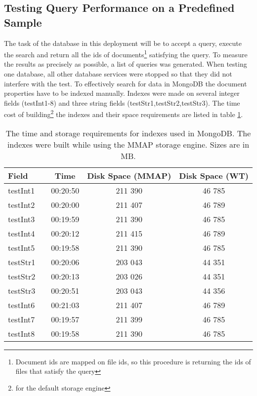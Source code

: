 \subsection{Testing Query Performance on a Predefined Sample}

The task of the database in this deployment will be to accept a query, execute the search and return all the 
ids of documents\footnote{Document ids are mapped on file ids, so this procedure is returning the ids of files
that satisfy the query} satisfying the query. To measure the results as precisely as possible, a list of
queries was generated. When testing one database, all other database services were stopped so that they did not
interfere with the test. To effectively search for data in MongoDB the document properties have to be 
indexed manually. Indexes were made on several integer fields (testInt1-8) and three string fields 
(testStr1,testStr2,testStr3). The time cost of building\footnote{for the default storage engine} the 
indexes and their space requirements are listed in table \ref{tab:indexBuildTimes}.

\begin{table}[h]
\centering
\begin{tabular}{lcccc}
\toprule
\textbf{Field}   & & \textbf{Time}     & \textbf{Disk Space (MMAP)} & \textbf{Disk Space (WT)} \\ \midrule
testInt1 & & 00:20:50 & 211 390           & 46 785          \\ \hline
testInt2 & & 00:20:00 & 211 407           & 46 789          \\ \hline
testInt3 & & 00:19:59 & 211 390           & 46 785          \\ \hline
testInt4 & & 00:20:12 & 211 415           & 46 789          \\ \hline
testInt5 & & 00:19:58 & 211 390           & 46 785          \\ \hline
testStr1 & & 00:20:06 & 203 043           & 44 351          \\ \hline
testStr2 & & 00:20:13 & 203 026           & 44 351          \\ \hline
testStr3 & & 00:20:51 & 203 043           & 44 356          \\ \hline
testInt6 & & 00:21:03 & 211 407           & 46 789          \\ \hline
testInt7 & & 00:19:57 & 211 399           & 46 785          \\ \hline
testInt8 & & 00:19:58 & 211 390           & 46 785          \\ \toprule
\end{tabular}
\caption{The time and storage requirements for indexes used in MongoDB. The indexes were built while using
the MMAP storage engine. Sizes are in MB.}
\label{tab:indexBuildTimes}
\end{table}

